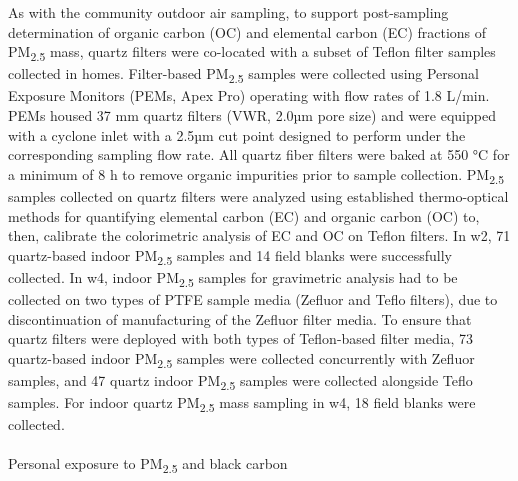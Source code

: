 \documentclass[
  letterpaper,
  DIV=11,
  numbers=noendperiod]{scrartcl}
\makeatletter
\let\oldparagraph\paragraph
\renewcommand{\paragraph}{ %
    \@ifstar %
      \xxxParagraphStar %
      \xxxParagraphNoStar %
  } %
\newcommand{\xxxParagraphStar}[1]{\oldparagraph*{#1}\mbox{}} %
\newcommand{\xxxParagraphNoStar}[1]{\oldparagraph{#1}\mbox{}} %
\providecommand{\DIFaddbegin}{} %
\providecommand{\DIFaddend}{} %
\providecommand{\DIFdelbegin}{} %
\providecommand{\DIFdelend}{} %
\newcommand{\DIFscaledelfig}{0.5}
\newlength{\DIFdelgraphicswidth} %
\newlength{\DIFdelgraphicsheight} %
\newcommand{\DIFaddincludegraphics}[2][]{{\color{blue}\fbox{\DIFOincludegraphics[#1]{#2}}}} %
\newcommand{\DIFdelincludegraphics}[2][]{%
\sbox{\DIFdelgraphicsbox}{\DIFOincludegraphics[#1]{#2}}%
\settoboxwidth{\DIFdelgraphicswidth}{\DIFdelgraphicsbox} %
\settoboxtotalheight{\DIFdelgraphicsheight}{\DIFdelgraphicsbox} %
\scalebox{\DIFscaledelfig}{%
\parbox[b]{\DIFdelgraphicswidth}{\usebox{\DIFdelgraphicsbox}\\[-\baselineskip] \rule{\DIFdelgraphicswidth}{0em}}\llap{\resizebox{\DIFdelgraphicswidth}{\DIFdelgraphicsheight}{%
\setlength{\unitlength}{\DIFdelgraphicswidth}%
\begin{picture}(1,1)%
\thicklines\linethickness{2pt} %
{\color[rgb]{1,0,0}\put(0,0){\framebox(1,1){}}}%
{\color[rgb]{1,0,0}\put(0,0){\line( 1,1){1}}}%
{\color[rgb]{1,0,0}\put(0,1){\line(1,-1){1}}}%
\end{picture}%
}\hspace*{3pt}}} %
} %
\DeclareRobustCommand{\DIFaddbegin}{\DIFOaddbegin \let\includegraphics\DIFaddincludegraphics} %
\DeclareRobustCommand{\DIFaddend}{\DIFOaddend \let\includegraphics\DIFOincludegraphics} %
\DeclareRobustCommand{\DIFdelbegin}{\DIFOdelbegin \let\includegraphics\DIFdelincludegraphics} %
\DeclareRobustCommand{\DIFdelend}{\DIFOaddend \let\includegraphics\DIFOincludegraphics} %
\makeatother
\begin{document}
As with the community outdoor air sampling, to support post-sampling
determination of organic carbon (OC) and elemental carbon (EC) fractions
of PM\textsubscript{2.5} mass, quartz filters were co-located with a
subset of Teflon filter samples collected in homes. Filter-based
PM\textsubscript{2.5} samples were collected using Personal Exposure
Monitors (PEMs, Apex Pro) operating with flow rates of 1.8 L/min. PEMs
housed 37 mm quartz filters (VWR, 2.0µm pore size) and were equipped
with a cyclone inlet with a 2.5µm cut point designed to perform under
the corresponding sampling flow rate. All quartz fiber filters were
baked at 550 °C for a minimum of 8 h to remove organic impurities prior
to sample collection. PM\textsubscript{2.5} samples collected on quartz
filters were analyzed using established thermo-optical methods for
quantifying elemental carbon (EC) and organic carbon (OC) to, then,
calibrate the colorimetric analysis of EC and OC on Teflon filters. In
w2, 71 quartz-based indoor PM\textsubscript{2.5} samples and 14 field
blanks were successfully collected. In w4, indoor PM\textsubscript{2.5}
samples for gravimetric analysis had to be collected on two types of
PTFE sample media (Zefluor and Teflo filters), due to discontinuation of
manufacturing of the Zefluor filter media. To ensure that quartz filters
were deployed with both types of Teflon-based filter media, 73
quartz-based indoor PM\textsubscript{2.5} samples were collected
concurrently with Zefluor samples, and 47 quartz indoor
PM\textsubscript{2.5} samples were collected alongside Teflo samples.
For indoor quartz PM\textsubscript{2.5} mass sampling in w4, 18 field
blanks were collected.

\DIFdelbegin %
\DIFdelend \DIFaddbegin \paragraph{\texorpdfstring{Personal exposure to PM\textsubscript{2.5}
and black
carbon}{Personal exposure to PM2.5 and black carbon}}\label{personal-exposure-to-pm2.5-and-black-carbon}
\DIFaddend 
\end{document}
